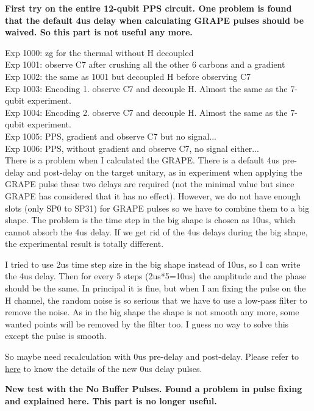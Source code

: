 \textbf{First try on the entire 12-qubit PPS circuit. One problem is found that the default 4us delay when calculating GRAPE pulses should be waived. So this part is not useful any more.}

Exp 1000: zg for the thermal without H decoupled \\
Exp 1001: observe C7 after crushing all the other 6 carbons and a gradient \\
Exp 1002: the same as 1001 but decoupled H before observing C7 \\
Exp 1003: Encoding 1. observe C7 and decouple H. Almost the same as the 7-qubit experiment. \\
Exp 1004: Encoding 2. observe C7 and decouple H. Almost the same as the 7-qubit experiment. \\
Exp 1005: PPS, gradient and observe C7 but no signal... \\
Exp 1006: PPS, without gradient and observe C7, no signal either... \\

\hypertarget{found:pulse_no_buffer}{There is a problem when I calculated the GRAPE.} There is a default 4us pre-delay and post-delay on the target unitary, as in experiment when applying the GRAPE pulse these two delays are required (not the minimal value but since GRAPE has considered that it has no effect). However, we do not have enough slots (only SP0 to SP31) for GRAPE pulses so we have to combine them to a big shape. The problem is the time step in the big shape is chosen as 10us, which cannot absorb the 4us delay. If we get rid of the 4us delays during the big shape, the experimental result is totally different.

I tried to use 2us time step size in the big shape instead of 10us, so I can write the 4us delay. Then for every 5 steps (2us*5=10us) the amplitude and the phase should be the same. In principal it is fine, but when I am fixing the pulse on the H channel, the random noise is so serious that we have to use a low-pass filter to remove the noise. As in the big shape the shape is not smooth any more, some wanted points will be removed by the filter too. I guess no way to solve this except the pulse is smooth.

So maybe need recalculation with 0us pre-delay and post-delay. Please refer to \hyperlink{reason:pulse_no_buffer}{here} to know the details of the new 0us delay pulses.

{}

\textbf{New test with the No Buffer Pulses. Found a problem in pulse fixing and explained here. This part is no longer useful.}

